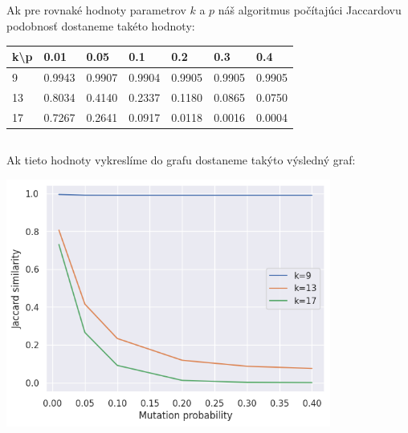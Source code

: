 \documentclass[a4paper]{article}
\begin{document}
\subsection{}

Ak pre rovnaké hodnoty parametrov $k$ a $p$ náš algoritmus počítajúci Jaccardovu podobnosť dostaneme takéto hodnoty: 

\begin{table}[!h]
	\begin{tabular}{|l|l|l|l|l|l|l|}
		\hline
		k\textbackslash p & 0.01   & 0.05   & 0.1    & 0.2    & 0.3    & 0.4    \\ \hline
		9   & 0.9943 & 0.9907 & 0.9904 & 0.9905 & 0.9905 & 0.9905 \\ \hline
		13  & 0.8034 & 0.4140 & 0.2337 & 0.1180 & 0.0865 & 0.0750 \\ \hline
		17  & 0.7267 & 0.2641 & 0.0917 & 0.0118 & 0.0016 & 0.0004 \\ \hline
	\end{tabular}
\end{table}

\subsection{}

Ak tieto hodnoty vykreslíme do grafu dostaneme takýto výsledný graf: 

\centerline{\includegraphics[width=0.8\textwidth]{jaccard}}
	
\subsection{}
\end{document}
